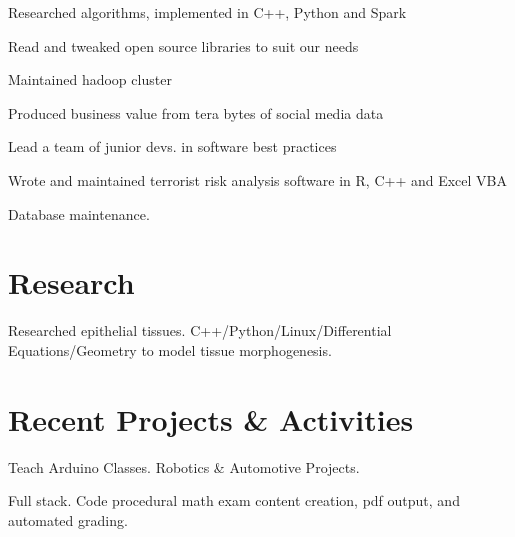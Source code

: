 \documentclass[]{deedy-resume-openfont}
\begin{document}
\begin{minipage}[t]{0.66\textwidth}
    \begin{tightemize}
    \item Researched algorithms, implemented in C++, Python and Spark
    \item Read and tweaked open source libraries to suit our needs
    \item Maintained hadoop cluster
    \item Produced business value from tera bytes of social media data
    \item Lead a team of junior devs. in software best practices
    \end{tightemize}
    \sectionsep

    \begin{tightemize}
    \item Wrote and maintained terrorist risk analysis software in R, C++ and Excel VBA
    \item Database maintenance.
    \end{tightemize}
    \sectionsep


    \section{Research}
    Researched epithelial tissues. C++/Python/Linux/Differential Equations/Geometry to model tissue morphogenesis.
    \sectionsep


    \section{Recent Projects \& Activities}

    Teach Arduino Classes. Robotics \& Automotive Projects.
    \sectionsep

    Full stack. Code procedural math exam content creation, pdf output, and automated grading.
    \sectionsep


\end{minipage}
\end{document}
